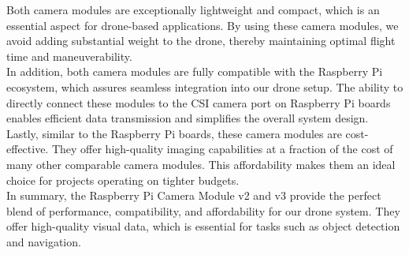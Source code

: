 Both camera modules are exceptionally lightweight and compact, which is an essential aspect for drone-based applications. By using these camera modules, we avoid adding substantial weight to the drone, thereby maintaining optimal flight time and maneuverability.\\

In addition, both camera modules are fully compatible with the Raspberry Pi ecosystem, which assures seamless integration into our drone setup. The ability to directly connect these modules to the CSI camera port on Raspberry Pi boards enables efficient data transmission and simplifies the overall system design.\\

Lastly, similar to the Raspberry Pi boards, these camera modules are cost-effective. They offer high-quality imaging capabilities at a fraction of the cost of many other comparable camera modules. This affordability makes them an ideal choice for projects operating on tighter budgets.\\

In summary, the Raspberry Pi Camera Module v2 and v3 provide the perfect blend of performance, compatibility, and affordability for our drone system. They offer high-quality visual data, which is essential for tasks such as object detection and navigation.\cite{rpicam3specs}\cite{rpicam2specs}\cite{rpicamspecs}\\




